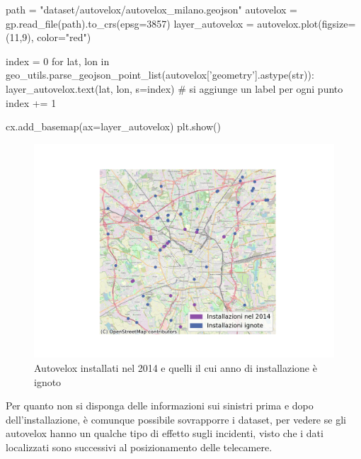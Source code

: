 \documentclass[a4paper,12pt]{report}
\begin{document}
\begin{code}[language=Python]
path = "dataset/autovelox/autovelox_milano.geojson"
autovelox = gp.read_file(path).to_crs(epsg=3857)
layer_autovelox = autovelox.plot(figsize=(11,9), color="red")
    
index = 0
for lat, lon in geo_utils.parse_geojson_point_list(autovelox['geometry'].astype(str)):
    layer_autovelox.text(lat, lon, s=index)
    # si aggiunge un label per ogni punto
    index += 1
    
cx.add_basemap(ax=layer_autovelox)
plt.show()
\end{code}

\begin{figure}
    \includegraphics[width=\linewidth]{../src/autovelox/autovelox_2014.png}
    \caption{Autovelox installati nel 2014 e quelli il cui anno di installazione è ignoto}
    \label{fig:autovelox-indici}
\end{figure}

Per quanto non si disponga delle informazioni sui sinistri prima e dopo dell'installazione, 
è comunque possibile sovrapporre i dataset, per vedere se gli autovelox 
hanno un qualche tipo di effetto sugli incidenti, visto che i dati 
localizzati sono successivi al posizionamento delle telecamere. 
\end{document}
